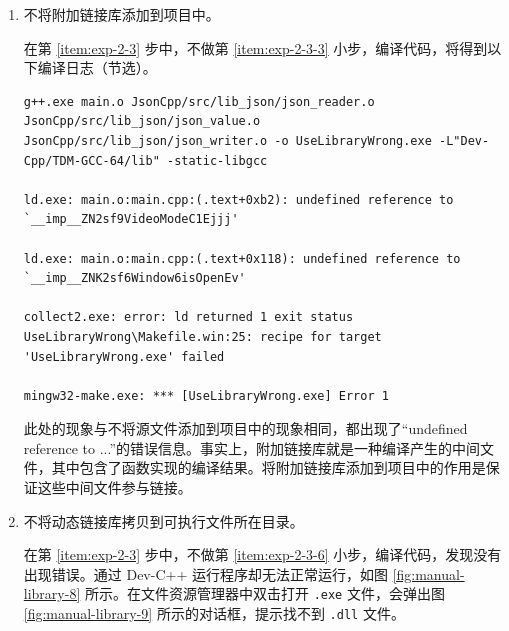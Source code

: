 \begin{enumerate}
\begin{enumerate}
\begin{lstlisting}[language={}]
UseLibraryWrong\Makefile.win:28: recipe for target 'main.o' failed
mingw32-make.exe: *** [main.o] Error 1
		\end{lstlisting}

		编译日志的第 3 行反馈，在编译 \lstinline[language={}]{main.cpp} 时就发生了错误，无法找到路径为 \lstinline[language={}]{json/json.h} 的文件。这是因为该路径是一个相对路径，但我们没有通过额外包含目录告诉编译器基础路径，因此编译器无法找到该文件。

		综上，将包含目录添加到项目中的作用是保证 \lstinline[language={[17]C++}]{#include} 指令知道相对路径对应的基础路径，从而顺利找到要包含的头文件。

		\item 不将附加链接库添加到项目中。

		在第 \ref{item:exp-2-3} 步中，不做第 \ref{item:exp-2-3-3} 小步，编译代码，将得到以下编译日志（节选）。

		\begin{lstlisting}[language={}]
g++.exe main.o JsonCpp/src/lib_json/json_reader.o JsonCpp/src/lib_json/json_value.o JsonCpp/src/lib_json/json_writer.o -o UseLibraryWrong.exe -L"Dev-Cpp/TDM-GCC-64/lib" -static-libgcc

ld.exe: main.o:main.cpp:(.text+0xb2): undefined reference to `__imp__ZN2sf9VideoModeC1Ejjj'

ld.exe: main.o:main.cpp:(.text+0x118): undefined reference to `__imp__ZNK2sf6Window6isOpenEv'

collect2.exe: error: ld returned 1 exit status
UseLibraryWrong\Makefile.win:25: recipe for target 'UseLibraryWrong.exe' failed

mingw32-make.exe: *** [UseLibraryWrong.exe] Error 1
		\end{lstlisting}

		此处的现象与不将源文件添加到项目中的现象相同，都出现了“undefined reference to ...”的错误信息。事实上，附加链接库就是一种编译产生的中间文件，其中包含了函数实现的编译结果。将附加链接库添加到项目中的作用是保证这些中间文件参与链接。

		\item 不将动态链接库拷贝到可执行文件所在目录。

		在第 \ref{item:exp-2-3} 步中，不做第 \ref{item:exp-2-3-6} 小步，编译代码，发现没有出现错误。通过 Dev-C++ 运行程序却无法正常运行，如图 \ref{fig:manual-library-8} 所示。在文件资源管理器中双击打开 \lstinline[language={}]{.exe} 文件，会弹出图 \ref{fig:manual-library-9} 所示的对话框，提示找不到 \lstinline[language={}]{.dll} 文件。


\end{enumerate}
\end{enumerate}
